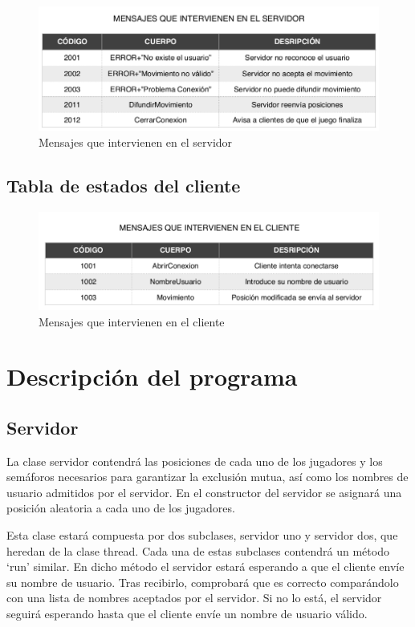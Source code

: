 \begin{figure}[h]
	\centering
	\includegraphics[width=.9\textwidth]{img/3}
	\caption{Mensajes que intervienen en el servidor}
\end{figure}







\subsection{Tabla de estados del cliente}	

\begin{figure}[h]
	\centering
	\includegraphics[width=.9\textwidth]{img/2}
	\caption{Mensajes que intervienen en el cliente}
\end{figure}


\newpage

\section{Descripción del programa}	

\subsection{Servidor}

La clase servidor contendrá las posiciones de cada uno de los jugadores y los semáforos necesarios para garantizar la exclusión mutua, así como los nombres de usuario admitidos por el servidor. En el constructor del servidor se asignará una posición aleatoria a cada uno de los jugadores. 

Esta clase estará compuesta por dos subclases, servidor uno y servidor dos, que heredan de la clase thread. Cada una de estas subclases contendrá un método ‘run’ similar. En dicho método el servidor estará esperando a que el cliente envíe su nombre de usuario. Tras recibirlo, comprobará que es correcto comparándolo con una lista de nombres aceptados por el servidor. Si no lo está, el servidor seguirá esperando hasta que el cliente envíe un nombre de usuario válido.

